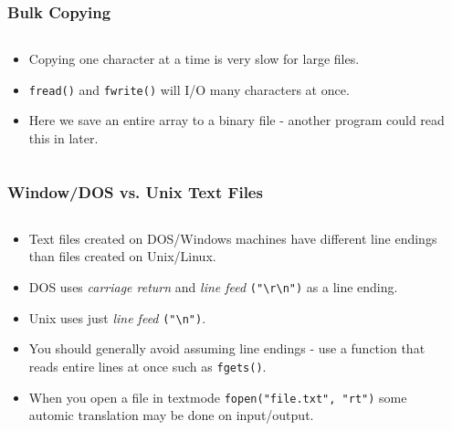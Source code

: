 
\begin{frame}[fragile]
\frametitle{Bulk Copying}
\begin{columns}[T]

\begin{column}{0.40\textwidth}
\begin{itemize}[<+->]
\item Copying one character at a time is very slow for large files.
\item \verb^fread()^ and \verb^fwrite()^ will I/O many characters at once.
\item Here we save an entire array to a binary file - another program could
read this in later.
\end{itemize}
\end{column}

\pause
\begin{column}{0.50\textwidth}

\end{column}


\end{columns}
\end{frame}


\begin{frame}[fragile]
\frametitle{Window/DOS vs. Unix Text Files}
\begin{columns}[T]


\begin{column}{0.45\textwidth}
\begin{itemize}[<+->]
\item Text files created on DOS/Windows machines have different line endings than files created on Unix/Linux.
\item DOS uses {\em carriage return} and {\em line feed} \verb^("\r\n")^ as a line ending.
\item Unix uses just {\em line feed} \verb^("\n")^.
\item You should generally avoid assuming line endings - use a function that reads entire lines at once such as \verb^fgets()^.
\item When you open a file in textmode \verb^fopen("file.txt", "rt")^ some automic translation may be done on input/output.
\end{itemize}
\end{column}

\pause
\begin{column}{0.45\textwidth}

\end{column}

\end{columns}
\end{frame}


\endinput

